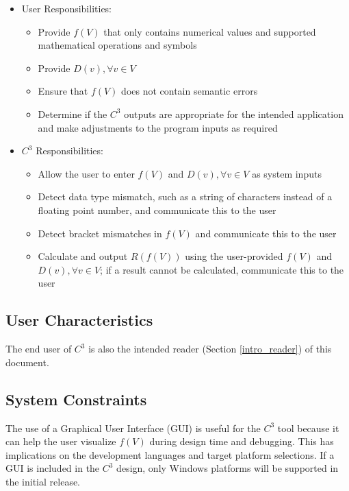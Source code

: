 \documentclass[12pt]{article}
\newcommand{\prognameAbbrv}{$C^{3}$}
\begin{document}
\begin{itemize}
	\item User Responsibilities:
	\begin{itemize}
		\item Provide $f(V)$ that only contains numerical values and supported 
		mathematical operations and symbols
		\item Provide $D(v), \forall v\in V$
		\item Ensure that $f(V)$ does not contain semantic errors
		\item Determine if the \prognameAbbrv{} outputs are appropriate for 
		the intended application and make adjustments to the program inputs as 
		required
	\end{itemize}

	\item \prognameAbbrv{} Responsibilities:
	\begin{itemize}
		\item Allow the user to enter $f(V)$ and $D(v), \forall v\in V$	as 
		system inputs
		\item Detect data type mismatch, such as a string of characters instead 
		of a floating point number, and communicate this to the user
		\item Detect bracket mismatches in $f(V)$ and communicate this to the 
		user
		\item Calculate and output $R(f(V))$ using the user-provided $f(V)$ and 
		$D(v), \forall v\in V$; if a result cannot be calculated, communicate 
		this to the user
	\end{itemize}
\end{itemize}

\subsection{User Characteristics} \label{SecUserCharacteristics}
The end user of \prognameAbbrv{} is also the intended reader (Section 
\ref{intro_reader}) of this document.

\subsection{System Constraints}
\label{sec_sysconstraints}
The use of a Graphical User Interface (GUI) is useful for the \prognameAbbrv{} 
tool because it can help the user visualize $f(V)$ during design time and 
debugging. This has implications on the development languages and target 
platform selections. If a GUI is included in the \prognameAbbrv{} design, only 
Windows platforms will be supported in the initial release.
\end{document}
